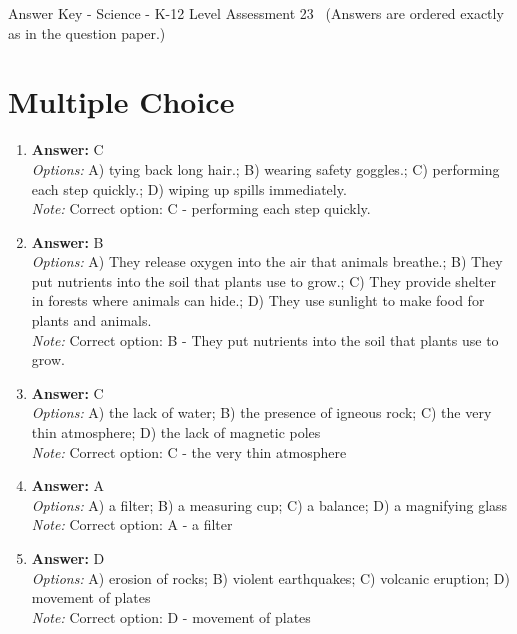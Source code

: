 \documentclass[12pt]{article}
\begin{document}
\begin{center}
Answer Key - Science - K-12 Level Assessment 23 \
\small (Answers are ordered exactly as in the question paper.)
\end{center}

\section*{Multiple Choice}
\begin{enumerate}[label=\arabic*.]
\item \textbf{Answer:} C
\\ \textit{Options:} A) tying back long hair.; B) wearing safety goggles.; C) performing each step quickly.; D) wiping up spills immediately.
\\ \textit{Note:} Correct option: C - performing each step quickly.
\item \textbf{Answer:} B
\\ \textit{Options:} A) They release oxygen into the air that animals breathe.; B) They put nutrients into the soil that plants use to grow.; C) They provide shelter in forests where animals can hide.; D) They use sunlight to make food for plants and animals.
\\ \textit{Note:} Correct option: B - They put nutrients into the soil that plants use to grow.
\item \textbf{Answer:} C
\\ \textit{Options:} A) the lack of water; B) the presence of igneous rock; C) the very thin atmosphere; D) the lack of magnetic poles
\\ \textit{Note:} Correct option: C - the very thin atmosphere
\item \textbf{Answer:} A
\\ \textit{Options:} A) a filter; B) a measuring cup; C) a balance; D) a magnifying glass
\\ \textit{Note:} Correct option: A - a filter
\item \textbf{Answer:} D
\\ \textit{Options:} A) erosion of rocks; B) violent earthquakes; C) volcanic eruption; D) movement of plates
\\ \textit{Note:} Correct option: D - movement of plates
\end{enumerate}
\end{document}
